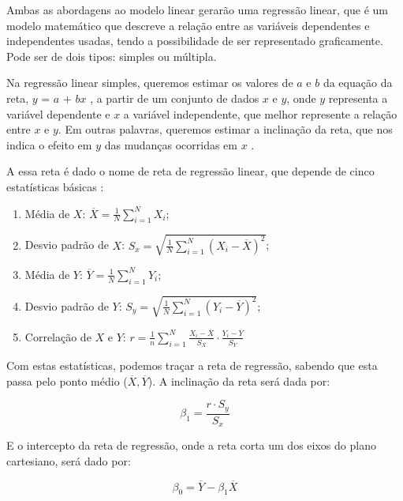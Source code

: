 \documentclass[
    12pt,               %
    openright,          %
    oneside,            %
    a4paper,            %
    english,            %
    brazil              %
    ]{abntex2}
\begin{document}
Ambas as abordagens ao modelo linear gerarão uma regressão linear, que é um modelo matemático que descreve 
a relação entre as variáveis dependentes e independentes usadas, tendo a possibilidade de ser representado 
graficamente. Pode ser de dois tipos: simples ou múltipla.

Na regressão linear simples, queremos estimar os valores de $a$ e $b$ da equação da reta, $y$ = $a$ + $bx$
, a partir de um conjunto de dados $x$ e $y$, onde $y$ representa a variável dependente e $x$ a variável 
independente, que melhor represente a relação entre $x$ e $y$. Em outras palavras, queremos estimar a 
inclinação da reta, que nos indica o efeito em $y$ das mudanças ocorridas em $x$ \cite{modelos_regressao_linear}.

A essa reta é dado o nome de reta de regressão linear, que depende de cinco estatísticas básicas
\cite{modelos_regressao_linear}:

\begin{enumerate}
    \item Média de $X$: $\overline{X} = \frac{1}{N} \sum_{i=1}^{N} X_i$;
    \item Desvio padrão de $X$: $S_x = \sqrt{ \frac{1}{N} \sum_{i=1}^{N} (X_i - \overline{X})^2 }$;
    \item Média de $Y$: $\overline{Y} = \frac{1}{N} \sum_{i=1}^{N} Y_i$;
    \item Desvio padrão de $Y$: $S_y = \sqrt{ \frac{1}{N} \sum_{i=1}^{N} (Y_i - \overline{Y})^2 }$;
    \item Correlação de $X$ e $Y$: $r = \frac{1}{n} \sum_{i=1}^{N} \frac{X_i - \overline{X}}{S_X} \cdot \frac{Y_i - \overline{Y}}{S_Y}$
\end{enumerate}

Com estas estatísticas, podemos traçar a reta de regressão, sabendo que esta passa pelo ponto médio
($\overline{X}, \overline{Y}$). A inclinação da reta será dada por:

\begin{equation}
    \label{eq:inclinacao_reta}
    \beta_1 = \frac{r \cdot S_y}{S_x}
\end{equation}

E o intercepto da reta de regressão, onde a reta corta um dos eixos do plano cartesiano, 
será dado por:

\begin{equation}
    \label{eq:intercepto_reta}
    \beta_0 = \overline{Y} - \beta_1 \overline{X}
\end{equation}
\end{document}
